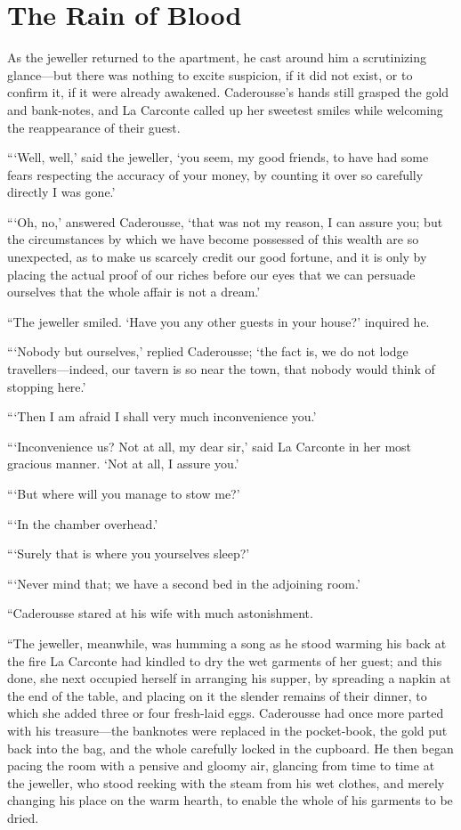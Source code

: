 \chapter{The Rain of Blood}

As the jeweller returned to the apartment, he cast around him a
scrutinizing glance—but there was nothing to excite suspicion, if it
did not exist, or to confirm it, if it were already awakened.
Caderousse’s hands still grasped the gold and bank-notes, and La
Carconte called up her sweetest smiles while welcoming the reappearance
of their guest.

“‘Well, well,’ said the jeweller, ‘you seem, my good friends, to have
had some fears respecting the accuracy of your money, by counting it
over so carefully directly I was gone.’

“‘Oh, no,’ answered Caderousse, ‘that was not my reason, I can assure
you; but the circumstances by which we have become possessed of this
wealth are so unexpected, as to make us scarcely credit our good
fortune, and it is only by placing the actual proof of our riches
before our eyes that we can persuade ourselves that the whole affair is
not a dream.’

“The jeweller smiled. ‘Have you any other guests in your house?’
inquired he.

“‘Nobody but ourselves,’ replied Caderousse; ‘the fact is, we do not
lodge travellers—indeed, our tavern is so near the town, that nobody
would think of stopping here.’

“‘Then I am afraid I shall very much inconvenience you.’

“‘Inconvenience us? Not at all, my dear sir,’ said La Carconte in her
most gracious manner. ‘Not at all, I assure you.’

“‘But where will you manage to stow me?’

“‘In the chamber overhead.’

“‘Surely that is where you yourselves sleep?’

“‘Never mind that; we have a second bed in the adjoining room.’

“Caderousse stared at his wife with much astonishment.

“The jeweller, meanwhile, was humming a song as he stood warming his
back at the fire La Carconte had kindled to dry the wet garments of her
guest; and this done, she next occupied herself in arranging his
supper, by spreading a napkin at the end of the table, and placing on
it the slender remains of their dinner, to which she added three or
four fresh-laid eggs. Caderousse had once more parted with his
treasure—the banknotes were replaced in the pocket-book, the gold put
back into the bag, and the whole carefully locked in the cupboard. He
then began pacing the room with a pensive and gloomy air, glancing from
time to time at the jeweller, who stood reeking with the steam from his
wet clothes, and merely changing his place on the warm hearth, to
enable the whole of his garments to be dried.

